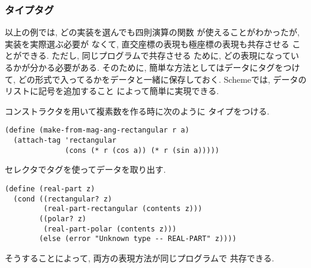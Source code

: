 \subsubsection{タイプタグ}
以上の例では, どの実装を選んでも四則演算の関数
が使えることがわかったが, 実装を実際選ぶ必要が
なくて, 直交座標の表現も極座標の表現も共存させる
ことができる. ただし, 同じプログラムで共存させる
ために, どの表現になっているかが分かる必要がある.
そのために, 簡単な方法としてはデータにタグをつけて,
どの形式で入ってるかをデータと一緒に保存しておく.
Schemeでは, データのリストに記号を追加すること
によって簡単に実現できる.

コンストラクタを用いて複素数を作る時に次のように
タイプをつける.

\begin{lstlisting}[basicstyle=\footnotesize]
(define (make-from-mag-ang-rectangular r a)
  (attach-tag 'rectangular
              (cons (* r (cos a)) (* r (sin a)))))
\end{lstlisting}

セレクタでタグを使ってデータを取り出す.

\begin{lstlisting}[basicstyle=\footnotesize]
(define (real-part z)
  (cond ((rectangular? z)
         (real-part-rectangular (contents z)))
        ((polar? z)
         (real-part-polar (contents z)))
        (else (error "Unknown type -- REAL-PART" z))))
\end{lstlisting}

そうすることによって, 両方の表現方法が同じプログラムで
共存できる.
